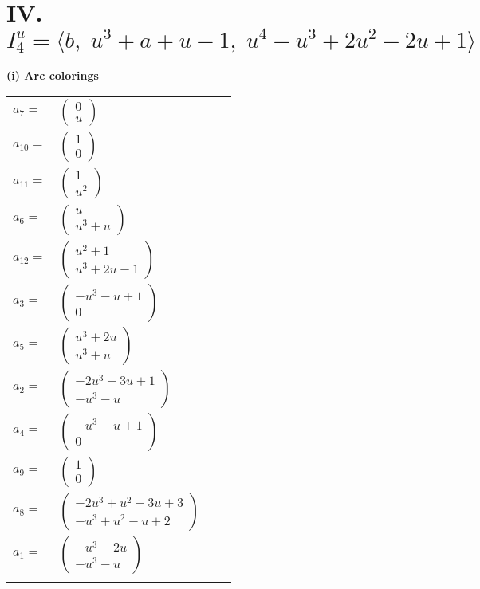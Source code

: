\documentclass[1p]{elsarticle_modified}
\theoremstyle{definition}
\begin{document}
\centering \section*{IV. $I^u_{4}= \langle b,\;u^3+a+u-1,\;u^4- u^3+2 u^2-2 u+1 \rangle$}
\flushleft \textbf{(i) Arc colorings}\\
\begin{tabular}{m{7pt} m{180pt} m{7pt} m{180pt} }
\flushright $a_{7}=$&$\begin{pmatrix}0\\u\end{pmatrix}$ \\
\flushright $a_{10}=$&$\begin{pmatrix}1\\0\end{pmatrix}$ \\
\flushright $a_{11}=$&$\begin{pmatrix}1\\u^2\end{pmatrix}$ \\
\flushright $a_{6}=$&$\begin{pmatrix}u\\u^3+u\end{pmatrix}$ \\
\flushright $a_{12}=$&$\begin{pmatrix}u^2+1\\u^3+2 u-1\end{pmatrix}$ \\
\flushright $a_{3}=$&$\begin{pmatrix}- u^3- u+1\\0\end{pmatrix}$ \\
\flushright $a_{5}=$&$\begin{pmatrix}u^3+2 u\\u^3+u\end{pmatrix}$ \\
\flushright $a_{2}=$&$\begin{pmatrix}-2 u^3-3 u+1\\- u^3- u\end{pmatrix}$ \\
\flushright $a_{4}=$&$\begin{pmatrix}- u^3- u+1\\0\end{pmatrix}$ \\
\flushright $a_{9}=$&$\begin{pmatrix}1\\0\end{pmatrix}$ \\
\flushright $a_{8}=$&$\begin{pmatrix}-2 u^3+u^2-3 u+3\\- u^3+u^2- u+2\end{pmatrix}$ \\
\flushright $a_{1}=$&$\begin{pmatrix}- u^3-2 u\\- u^3- u\end{pmatrix}$\\&\end{tabular}
\end{document}
